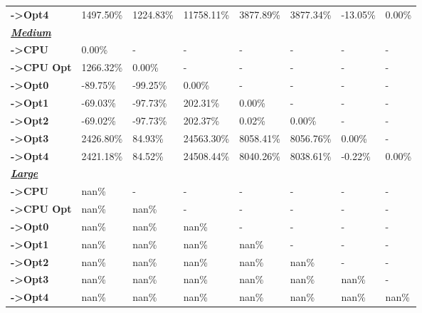 \begin{table}[H]
\begin{tabular}{llllllll}
    \rowcolor[HTML]{EFEFEF} \cellcolor[HTML]{DAE8FC} \textbf{->Opt4} & 1497.50\% & 1224.83\% & 11758.11\% & 3877.89\% & 3877.34\% & 	-13.05\% & 	0.00\% \\
    \cellcolor[HTML]{DAE8FC} \textbf{\textbf{{\emph{{\underline{{Medium}}}}}}} &  &  &  &  &  &  &  \\
    \rowcolor[HTML]{EFEFEF} \cellcolor[HTML]{DAE8FC} \textbf{->CPU} & 0.00\% & - & - & - & - & - & - \\
    \cellcolor[HTML]{DAE8FC} \textbf{->CPU Opt} & 1266.32\% & 0.00\% & - & - & - & - & - \\
    \rowcolor[HTML]{EFEFEF} \cellcolor[HTML]{DAE8FC} \textbf{->Opt0} & -89.75\% & -99.25\% & 0.00\% & - & - & - & - \\
    \cellcolor[HTML]{DAE8FC} \textbf{->Opt1} & -69.03\% & -97.73\% & 202.31\% & 0.00\% & - & - & - \\
    \rowcolor[HTML]{EFEFEF} \cellcolor[HTML]{DAE8FC} \textbf{->Opt2} & -69.02\% & -97.73\% & 202.37\% & 0.02\% & 0.00\% & - & - \\
    \cellcolor[HTML]{DAE8FC} \textbf{->Opt3} & 2426.80\% & 84.93\% & 24563.30\% & 8058.41\% & 8056.76\% & 	0.00\% & - \\
    \rowcolor[HTML]{EFEFEF} \cellcolor[HTML]{DAE8FC} \textbf{->Opt4} & 2421.18\% & 84.52\% & 24508.44\% & 8040.26\% & 8038.61\% & 	-0.22\% & 	0.00\% \\
    \cellcolor[HTML]{DAE8FC} \textbf{\textbf{{\emph{{\underline{{Large}}}}}}} &  &  &  &  &  &  &  \\
    \rowcolor[HTML]{EFEFEF} \cellcolor[HTML]{DAE8FC} \textbf{->CPU} & nan\% & - & - & - & - & - & - \\
    \cellcolor[HTML]{DAE8FC} \textbf{->CPU Opt} & nan\% & nan\% & - & - & - & - & - \\
    \rowcolor[HTML]{EFEFEF} \cellcolor[HTML]{DAE8FC} \textbf{->Opt0} & nan\% & nan\% & nan\% & - & - & - & - \\
    \cellcolor[HTML]{DAE8FC} \textbf{->Opt1} & nan\% & nan\% & nan\% & nan\% & - & - & - \\
    \rowcolor[HTML]{EFEFEF} \cellcolor[HTML]{DAE8FC} \textbf{->Opt2} & nan\% & nan\% & nan\% & nan\% & nan\% & - & - \\
    \cellcolor[HTML]{DAE8FC} \textbf{->Opt3} & nan\% & nan\% & nan\% & nan\% & nan\% & 	nan\% & - \\
    \rowcolor[HTML]{EFEFEF} \cellcolor[HTML]{DAE8FC} \textbf{->Opt4} & nan\% & nan\% & nan\% & nan\% & nan\% & 	nan\% & 	nan\% \\

\end{tabular}
\end{table}
